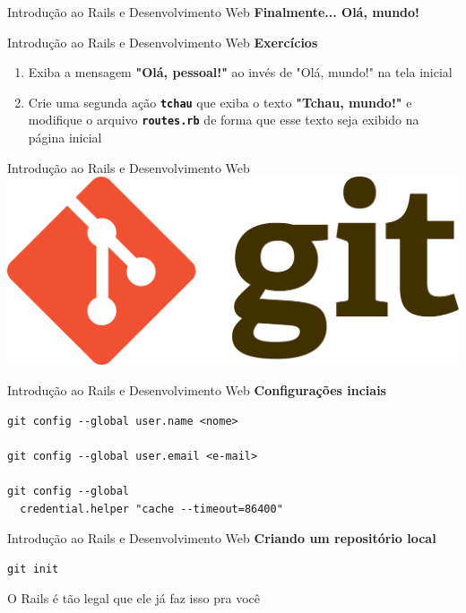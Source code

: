 \documentclass[10pt]{beamer}
\begin{document}
\begin{frame}{Introdução ao Rails e Desenvolvimento Web}
  \huge
  \textbf{Finalmente... \alert{Olá, mundo!}}
\end{frame}

\begin{frame}{Introdução ao Rails e Desenvolvimento Web}
  \huge
  \textbf{Exercícios}
  \vfill
  \Large
  \begin{enumerate}
    \item Exiba a mensagem \textbf{"Olá, pessoal!"} ao invés de "Olá, mundo!" na tela inicial
    \item Crie uma segunda ação \textbf{\texttt{tchau}} que exiba o texto \textbf{"Tchau, mundo!"} e modifique o arquivo \textbf{\texttt{routes.rb}} de forma que esse texto seja exibido na página inicial
  \end{enumerate}
\end{frame}

\begin{frame}{Introdução ao Rails e Desenvolvimento Web}
  \huge
  \includegraphics[width=\textwidth]{images/git.png}
\end{frame}

\begin{frame}[fragile]{Introdução ao Rails e Desenvolvimento Web}
  \huge
  \textbf{Configurações inciais}
  \vfill
  \large
  \begin{verbatim}
git config --global user.name <nome>

git config --global user.email <e-mail>

git config --global
  credential.helper "cache --timeout=86400"
  \end{verbatim}
\end{frame}

\begin{frame}[fragile]{Introdução ao Rails e Desenvolvimento Web}
  \huge
  \textbf{Criando um repositório local}
  \vfill
  \begin{verbatim}
git init
  \end{verbatim}
  \vfill
  \large
  O Rails é tão legal que ele já faz isso pra você \faSmileO
\end{frame}
\end{document}
